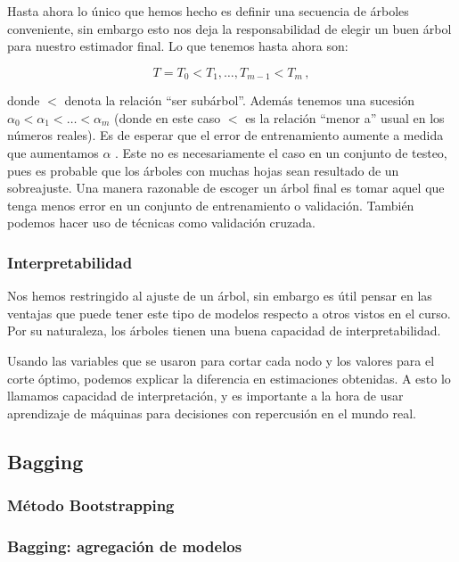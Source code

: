 Hasta ahora lo único que hemos hecho es definir una secuencia de árboles conveniente, sin embargo esto nos deja la responsabilidad de elegir un buen árbol para nuestro estimador final. Lo que tenemos hasta ahora son:

\begin{equation}
    T = T_0 < T_1, \dots, T_{m-1} < T_m \,,
\end{equation}

donde $<$ denota la relación ``ser subárbol''. Además tenemos una sucesión $\alpha_0 < \alpha_1 < \dots < \alpha_m$ (donde en este caso $<$ es la relación ``menor a'' usual en los números reales). Es de esperar que el error de entrenamiento aumente a medida que aumentamos $\alpha$ . Este no es necesariamente el caso en un conjunto de testeo, pues es probable que los árboles con muchas hojas sean resultado de un sobreajuste. Una manera razonable de escoger un árbol final es tomar aquel que tenga menos error en un conjunto de entrenamiento o validación. También podemos hacer uso de técnicas como validación cruzada.


\subsubsection{Interpretabilidad}

Nos hemos restringido al ajuste de un árbol, sin embargo es útil pensar en las ventajas que puede tener este tipo de modelos respecto a otros vistos en el curso. Por su naturaleza, los árboles tienen una buena capacidad de interpretabilidad. %


Usando las variables que se usaron para cortar cada nodo y los valores para el corte óptimo, podemos explicar la diferencia en estimaciones obtenidas. A esto lo llamamos capacidad de interpretación, y es importante a la hora de usar aprendizaje de máquinas para decisiones con repercusión en el mundo real.


\subsection{Bagging}
\label{sec:bagging}

\subsubsection{Método Bootstrapping}

\subsubsection{Bagging: agregación de modelos}

